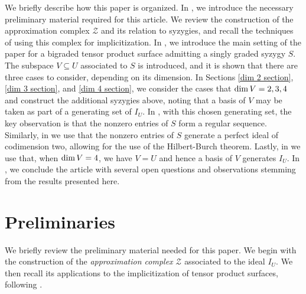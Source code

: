 \documentclass[reqno]{amsart}
\numberwithin{equation}{section}
\theoremstyle{definition}
\def\Z{\mathcal{Z}}
\def\dim{\mathop{\rm dim}}
\begin{document}
We briefly describe how this paper is organized. In , we introduce the necessary preliminary material required for this article. We review the construction of the approximation complex $\Z$ and its relation to syzygies, and recall the techniques of \cite{Botbol11} using this complex for implicitization. In , we introduce the main setting of the paper for a bigraded tensor product surface admitting a singly graded syzygy $S$. The subspace $V\subseteq U$ associated to $S$ is introduced, and it is shown that there are three cases to consider, depending on its dimension. In Sections \ref{dim 2 section}, \ref{dim 3 section}, and \ref{dim 4 section}, we consider the cases that $\dim V =2,3,4$ and construct the additional syzygies above, noting that a basis of $V$ may be taken as part of a generating set of $I_U$. In , with this chosen generating set, the key observation is that the nonzero entries of $S$ form a regular sequence. Similarly, in  we use that the nonzero entries of $S$ generate a perfect ideal of codimension two, allowing for the use of the Hilbert-Burch theorem. Lastly, in  we use that, when $\dim V=4$, we have $V=U$ and hence a basis of $V$ generates $I_U$. In , we conclude the article with several open questions and observations stemming from the results presented here.











\section{Preliminaries}\label{Prelim Section}

We briefly review the preliminary material needed for this paper. We begin with the construction of the \textit{approximation complex} $\Z$ \cite{HSV82,HSV83} associated to the ideal $I_U$. We then recall its applications to the implicitization of tensor product surfaces, following \cite{Botbol11}. 
\end{document}

